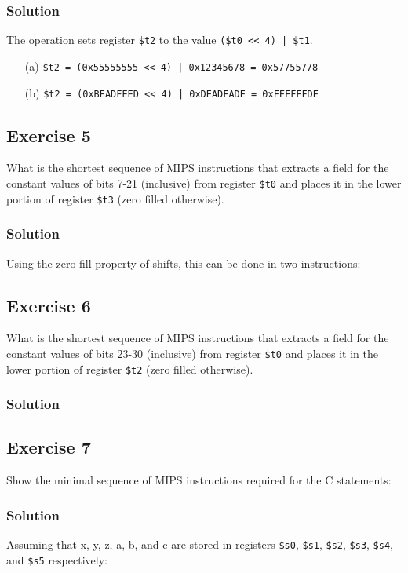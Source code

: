 \documentclass[12pt]{article}
\begin{document}
\subsubsection*{Solution}
The operation sets register {\tt \$t2} to the value {\tt(\$t0 << 4) | \$t1}.
\begin{itemize}
\item[(a)] {\tt\$t2 = (0x55555555 << 4) | 0x12345678 = 0x57755778}
\item[(b)] {\tt\$t2 = (0xBEADFEED << 4) | 0xDEADFADE = 0xFFFFFFDE}
\end{itemize}

\subsection*{Exercise 5}
What is the shortest sequence of MIPS instructions that extracts a field for the constant values of bits 7-21 (inclusive) from register {\tt\$t0} and places it in the lower portion of register {\tt\$t3} (zero filled otherwise).
\subsubsection*{Solution}
Using the zero-fill property of shifts, this can be done in two instructions:


\subsection*{Exercise 6}
What is the shortest sequence of MIPS instructions that extracts a field for the constant values of bits 23-30 (inclusive) from register {\tt\$t0} and places it in the lower portion of register {\tt\$t2} (zero filled otherwise).
\subsubsection*{Solution}


\subsection*{Exercise 7}
Show the minimal sequence of MIPS instructions required for the C statements:

\subsubsection*{Solution}
Assuming that x, y, z, a, b, and c are stored in registers {\tt\$s0}, {\tt\$s1}, {\tt\$s2}, {\tt\$s3}, {\tt\$s4}, and {\tt\$s5} respectively:

\end{document}
